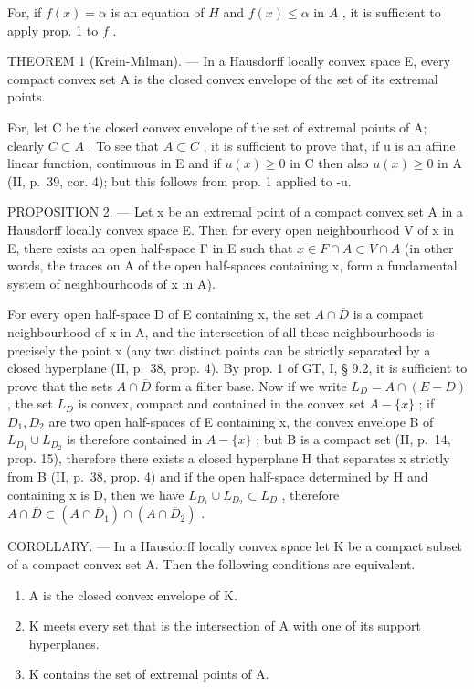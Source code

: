 For, if \(f(x) = \alpha\) is an equation of \(H\) and \(f(x) \leqslant \alpha\) in \(A\) , it is sufficient to apply prop. 1 to \(f\) .

THEOREM 1 (Krein-Milman). --- In a Hausdorff locally convex space E, every compact convex set A is the closed convex envelope of the set of its extremal points.

For, let C be the closed convex envelope of the set of extremal points of A; clearly \(C \subset A\) . To see that \(A \subset C\) , it is sufficient to prove that, if u is an affine linear function, continuous in E and if \(u(x) \geqslant 0\) in C then also \(u(x) \geqslant 0\) in A (II, p.~39, cor. 4); but this follows from prop. 1 applied to -u.

PROPOSITION 2. --- Let x be an extremal point of a compact convex set A in a Hausdorff locally convex space E. Then for every open neighbourhood V of x in E, there exists an open half-space F in E such that \(x \in F \cap A \subset V \cap A\) (in other words, the traces on A of the open half-spaces containing x, form a fundamental system of neighbourhoods of x in A).

For every open half-space D of E containing x, the set \(A \cap \overline{D}\) is a compact neighbourhood of x in A, and the intersection of all these neighbourhoods is precisely the point x (any two distinct points can be strictly separated by a closed hyperplane (II, p.~38, prop. 4). By prop. 1 of GT, I, § 9.2, it is sufficient to prove that the sets \(A \cap \overline{D}\) form a filter base. Now if we write \(L_{D} = A \cap (E - D)\) , the set \(L_{D}\) is convex, compact and contained in the convex set \(A - \{x\}\) ; if \(D_{1}, D_{2}\) are two open half-spaces of E containing x, the convex envelope B of \(L_{D_{1}} \cup L_{D_{2}}\) is therefore contained in \(A - \{x\}\) ; but B is a compact set (II, p.~14, prop. 15), therefore there exists a closed hyperplane H that separates x strictly from B (II, p.~38, prop. 4) and if the open half-space determined by H and containing x is D, then we have \(L_{D_{1}} \cup L_{D_{2}} \subset L_{D}\) , therefore \(A \cap \overline{D} \subset (A \cap \overline{D}_{1}) \cap (A \cap \overline{D}_{2})\) .

COROLLARY. --- In a Hausdorff locally convex space let K be a compact subset of a compact convex set A. Then the following conditions are equivalent.

\begin{enumerate}
\def\labelenumi{\alph{enumi})}
\item
  A is the closed convex envelope of K.
\item
  K meets every set that is the intersection of A with one of its support hyperplanes.
\item
  K contains the set of extremal points of A.
\end{enumerate}

